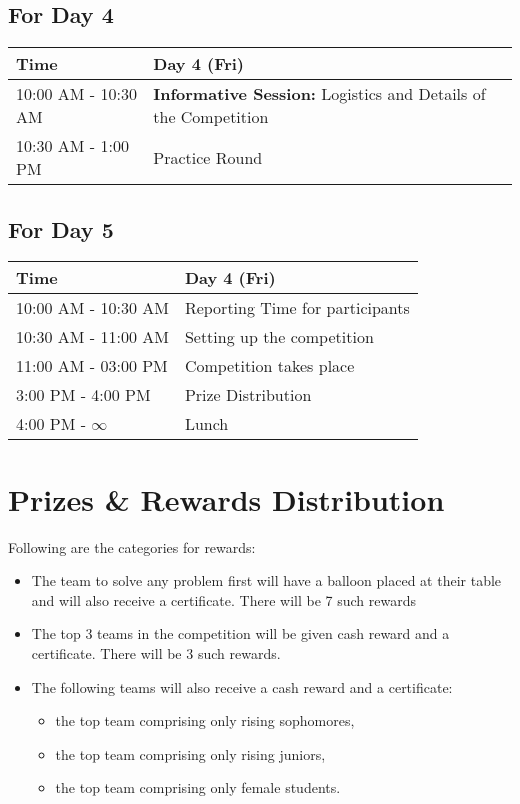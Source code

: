 \documentclass[12pt]{article}
\begin{document}
\subsection*{\centering For Day 4}
\begin{table}[H]
  \centering
  \begin{tabular}{|p{2.1cm}|p{12.9cm}|}
    \hline
    Time & Day 4 (Fri) \\ 
    \hline
    10:00 AM - 10:30 AM & \textbf{Informative Session:} Logistics and Details of the Competition \\
    \hline
    10:30 AM - 1:00 PM & Practice Round \\
    \hline
  \end{tabular}
\end{table}

\subsection*{\centering For Day 5}
\begin{table}[H]
  \centering
  \begin{tabular}{|p{2.1cm}|p{12.9cm}|}
    \hline
    Time & Day 4 (Fri) \\ 
    \hline
    10:00 AM - 10:30 AM & Reporting Time for participants \\
    \hline
    10:30 AM - 11:00 AM & Setting up the competition \\
    \hline
    11:00 AM - 03:00 PM & Competition takes place \\
    \hline
    3:00 PM - 4:00 PM & Prize Distribution \\
    \hline
    4:00 PM - $\infty$ & Lunch \\
    \hline
  \end{tabular}
\end{table}

\section*{\centering Prizes \& Rewards Distribution}
Following are the categories for rewards:
\begin{itemize}
\item The team to solve any problem first will have a balloon placed at their table and will also receive a certificate. There will be 7 such rewards
\item The top 3 teams in the competition will be given cash reward and a certificate. There will be 3 such rewards.
\item The following teams will also receive a cash reward and a certificate:
  \begin{itemize}
  \item the top team comprising only rising sophomores,
  \item the top team comprising only rising juniors,
  \item the top team comprising only female students.
  \end{itemize}
\end{itemize}
\end{document}
